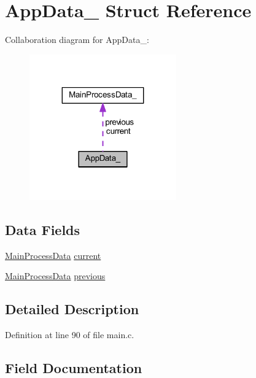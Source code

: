 \hypertarget{struct_app_data__}{}\section{App\+Data\+\_\+ Struct Reference}
\label{struct_app_data__}


Collaboration diagram for App\+Data\+\_\+\+:\nopagebreak
\begin{figure}[H]
\begin{center}
\leavevmode
\includegraphics[width=179pt]{struct_app_data____coll__graph}
\end{center}
\end{figure}
\subsection*{Data Fields}
\begin{DoxyCompactItemize}
\item 
\mbox{\hyperlink{main_8c_a10c0332e7cd68abe97ec61fa4ac93383}{Main\+Process\+Data}} \mbox{\hyperlink{struct_app_data___aab83920d96d162d986df2bbce5d382ab}{current}}
\item 
\mbox{\hyperlink{main_8c_a10c0332e7cd68abe97ec61fa4ac93383}{Main\+Process\+Data}} \mbox{\hyperlink{struct_app_data___a57a5b5fd3e09c0d8651bffc358acd3c4}{previous}}
\end{DoxyCompactItemize}


\subsection{Detailed Description}


Definition at line 90 of file main.\+c.



\subsection{Field Documentation}
\mbox{\label{struct_app_data___aab83920d96d162d986df2bbce5d382ab}} 
